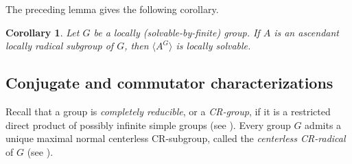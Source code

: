 \documentclass[11pt, reqno]{amsart}
\numberwithin{equation}{section}
\newtheorem{corollary}[theorem]{Corollary}
\theoremstyle{definition}
\numberwithin{equation}{section}
\begin{document}
The preceding lemma gives the following corollary.

\begin{corollary}\label{cor:ascendantlocsolsubgroupwithnorclosislocsol}
Let $G$ be a locally \textup{(\emph{solvable-by-finite})} group. If $A$ is an ascendant locally radical subgroup of $G$, then $\langle A^G \rangle$ is locally solvable.
\end{corollary}

\subsection{Conjugate and commutator characterizations} \hfill

\medskip
Recall that a group is \emph{completely reducible}, or a \emph{\textup{CR}-group}, if it is a restricted direct product of possibly infinite simple groups (see \cite[pp.~85 and~88]{Robinson:CourseTheoryGroups}). Every group $G$ admits a unique maximal normal centerless \textup{CR}-subgroup, called the \emph{centerless \textup{CR}-radical} of $G$ (see \cite[3.3.17]{Robinson:CourseTheoryGroups}).
\end{document}
